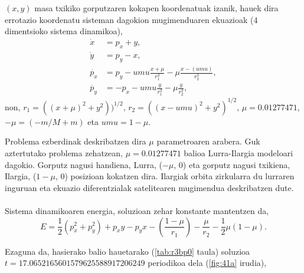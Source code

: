 $(x, y)$ masa txikiko gorputzaren kokapen koordenatuak izanik, hauek dira errotazio koordenatu sisteman dagokion mugimenduaren ekuazioak ($4$ dimentsioko sistema dinamikoa),
\begin{align*}
\dot{x} &=p_x+y,\\
\dot{y} &=p_y-x,\\
\dot{p_x} &=p_y-umu \frac{x+\mu}{r_1^3}-\mu \frac{x-(umu)}{r_2^3},\\
\dot{p_y} &=-p_x-umu \frac{y}{r_1^3}-\mu \frac{y}{r_2^3},
\end{align*}
non, $r_1=((x+\mu)^2+y^2))^{1/2}$, $r_2=((x-umu)^2+y^2)^{1/2}$, $\mu=0.01277471$, $-\mu=(-{m}/{M+m})$ eta $umu=1-\mu$.

Problema ezberdinak deskribatzen dira $\mu$ parametroaren arabera. Guk aztertutako problema zehatzean, $\mu = 0.01277471$ balioa Lurra-Ilargia modeloari dagokio. Gorputz nagusi handiena, Lurra, ($-\mu$, $0$) eta gorputz
nagusi txikiena, Ilargia, ($1 - \mu$, $0$) posizioan kokatzen dira. Ilargiak orbita zirkularra du lurraren inguruan eta ekuazio diferentzialak satelitearen mugimendua deskribatzen dute.

\paragraph*{}Sistema dinamikoaren energia, soluzioan zehar konstante mantentzen da,
\begin{equation*}
E=\frac{1}{2} (p_x^2+p_y^2)+p_x y-p_y x - (\frac{1-\mu}{r_1})-\frac{\mu}{r_2}-\frac{1}{2} \mu (1-\mu).
\end{equation*}

Ezaguna da, hasierako balio hauetarako (\ref{tab:r3bp0} taula) soluzioa $t=17.0652165601579625588917206249$ periodikoa dela (\ref{fig:41a} irudia),

\begin{table}[h]
\caption[R3BP problemaren hasierako balioak.]{R3BP problemaren hasierako balioak.}
\label{tab:r3bp0}       %
\centering
{}
\end{table}



